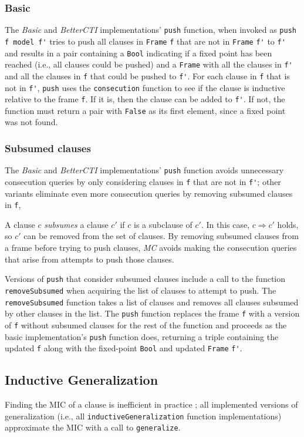 \documentclass[12pt,a4paper,twoside,openright]{report}
\begin{document}
{{\subsubsection{Basic}
The {\it Basic} and {\it BetterCTI} implementations' \verb,push, function,
when invoked as \verb,push f model f', tries to push all clauses in \verb,Frame, \verb,f,
that are not in \verb,Frame, \verb,f', to \verb,f', and
results in a pair containing a \verb,Bool, indicating if a fixed point has been reached
(i.e., all clauses could be pushed) and a \verb,Frame, with all the clauses in \verb,f', and all
the clauses in \verb,f, that could be pushed to \verb,f',.
For each clause in \verb,f, that is not in \verb,f',, \verb,push, uses the \verb,consecution, function to
see if the clause is inductive relative to the frame \verb,f,. If it is, then
the clause can be added to \verb,f',. If not, the
function must return a pair with \verb,False, as its first element, since a fixed point was not found.

\subsubsection{Subsumed clauses}
The \emph{Basic} and \emph{BetterCTI} implementations' \verb,push, function avoids unnecessary
consecution queries by only considering clauses in \verb,f, that are not in \verb,f',;
other variants eliminate even
more consecution queries by removing subsumed clauses in \verb,f,,

A clause $c$ \emph{subsumes} a clause $c'$ if $c$ is a subclause of
$c'$. In this case, $c \Rightarrow c'$ holds, so $c'$ can be removed from the set of clauses. By
removing subsumed clauses from a frame before trying to push clauses, \emph{MC}
avoids making the consecution queries that arise from attempts to push those clauses.

Versions of \verb,push, that consider subsumed clauses include a call to the function
\verb,removeSubsumed, when acquiring the list of clauses to attempt to push.
The \verb,removeSubsumed, function takes a list of clauses and removes all clauses
subsumed by other clauses in the list.
The \verb,push, function replaces the frame
\verb,f, with a version of \verb,f, without subsumed clauses
for the rest of the function and proceeds as the basic implementation's \verb,push, function does,
returning a triple containing the updated \verb,f, along with the fixed-point \verb,Bool,
and updated \verb,Frame, \verb,f',.

\subsection{Inductive Generalization}
\label{impl:generalization}
Finding the MIC of a clause is inefficient in practice
\cite{griggio14};
all implemented versions of generalization
(i.e., all \verb,inductiveGeneralization, function implementations) approximate the MIC with a call to
\verb,generalize,.

}}
\end{document}
